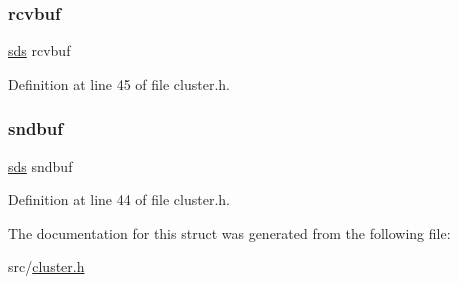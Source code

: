 \subsubsection{\texorpdfstring{rcvbuf}{rcvbuf}}
{\footnotesize\ttfamily \hyperlink{sds_8h_ad69abac3df4532879db9642c95f5ef6f}{sds} rcvbuf}



Definition at line 45 of file cluster.\+h.

\mbox{\label{structcluster_link_a3bedcd2fc8781d7cfc9239ecb3311ae2}} 
\subsubsection{\texorpdfstring{sndbuf}{sndbuf}}
{\footnotesize\ttfamily \hyperlink{sds_8h_ad69abac3df4532879db9642c95f5ef6f}{sds} sndbuf}



Definition at line 44 of file cluster.\+h.



The documentation for this struct was generated from the following file\+:\begin{DoxyCompactItemize}
\item 
src/\hyperlink{cluster_8h}{cluster.\+h}\end{DoxyCompactItemize}
